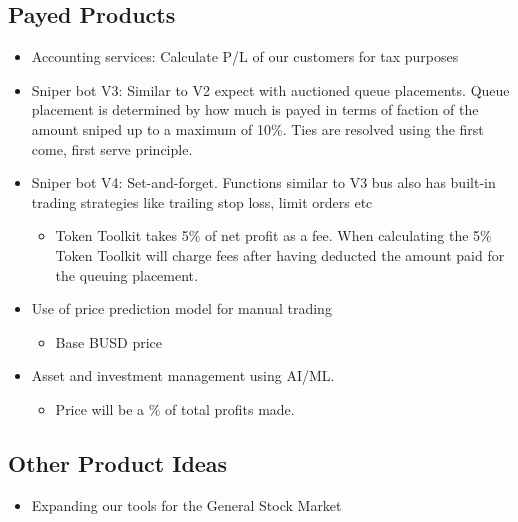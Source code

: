 \documentclass[11pt]{article}
\begin{document}
\subsection*{Payed Products}
\label{sec:org505338b}
\begin{itemize}
\item Accounting services: Calculate P/L of our customers for tax purposes
\item Sniper bot V3: Similar to V2 expect with auctioned queue placements.
Queue placement is determined by how much is payed in terms of faction of the
amount sniped up to a maximum of 10\%. Ties are resolved using the first
come, first serve principle.
\item Sniper bot V4: Set-and-forget. Functions similar to V3 bus also has built-in
trading strategies like trailing stop loss, limit orders etc
\begin{itemize}
\item Token Toolkit takes 5\% of net profit as a fee. When calculating the 5\% Token
Toolkit will charge fees after having deducted the amount paid for the
queuing placement.
\end{itemize}
\item Use of price prediction model for manual trading
\begin{itemize}
\item Base BUSD price
\end{itemize}
\item Asset and investment management using AI/ML.
\begin{itemize}
\item Price will be a \% of total profits made.
\end{itemize}
\end{itemize}

\subsection*{Other Product Ideas}
\label{sec:orgbea4273}
\begin{itemize}
\item Expanding our tools for the General Stock Market
\end{itemize}
\end{document}
